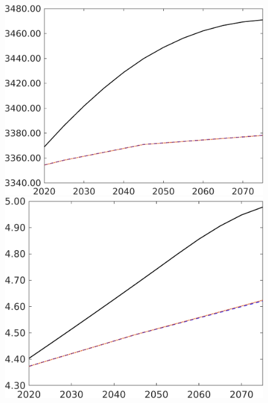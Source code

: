 \begin{figure}[h!!]
\begin{minipage}[]{0.32\textwidth}
	\end{minipage}
	\begin{minipage}[]{0.32\textwidth}
		\includegraphics[width=1\textwidth]{../../codding_model/own_basedOnFried/optimalPol_elastS_DisuSci/figures/all_1705/Af_CompEffOPT_T_NoTaus_spillover0_sep1_BN0_ineq0_etaa0.79_lgd0.png}
	\end{minipage}
	\begin{minipage}[]{0.32\textwidth}
		\includegraphics[width=1\textwidth]{../../codding_model/own_basedOnFried/optimalPol_elastS_DisuSci/figures/all_1705/An_CompEffOPT_T_NoTaus_spillover0_sep1_BN0_ineq0_etaa0.79_lgd0.png}

\end{minipage}
\end{figure}
